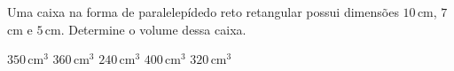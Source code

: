 Uma caixa na forma de paralelepídedo reto retangular possui dimensões $10$\,cm, $7$\,cm e $5$\,cm. Determine o volume dessa caixa.

$350$\,cm$^3$
$360$\,cm$^3$
$240$\,cm$^3$
$400$\,cm$^3$
$320$\,cm$^3$



